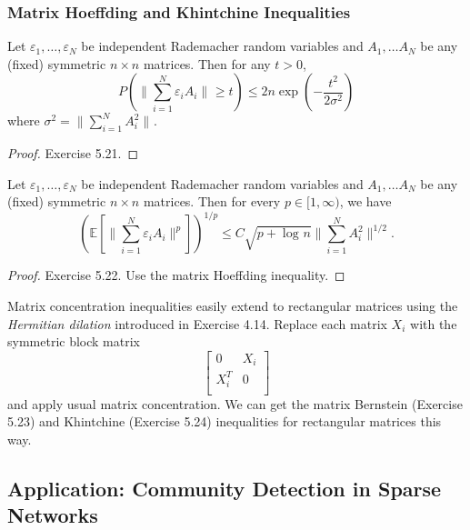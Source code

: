 \subsubsection{Matrix Hoeffding and Khintchine Inequalities}
\begin{theorem}
\label{thm:5.4.13}
Let $\varepsilon_1, \dots, \varepsilon_N$ be independent Rademacher random variables and $A_1, \dots A_N$ be 
any (fixed) symmetric $n \times n$ matrices. Then for any $t > 0$, 
\[ P \left( \lVert \sum_{i = 1}^{N} \varepsilon_i A_i \rVert_{} \geq t \right) 
\leq 2n \exp{\left( -\frac{t^2}{2 \sigma^2} \right)} \]
where $\sigma^2 = \lVert \sum_{i = 1}^{N} A_i^2 \rVert_{}$.
\end{theorem}

\begin{proof}
Exercise 5.21.
\end{proof}

\begin{theorem}
\label{thm:5.4.14}
Let $\varepsilon_1, \dots, \varepsilon_N$ be independent Rademacher random variables and $A_1, \dots A_N$ be 
any (fixed) symmetric $n \times n$ matrices. Then for every $p \in [1, \infty)$, we have 
\[ \left( \mathbb{E}\left[ \lVert \sum_{i = 1}^{N} \varepsilon_i A_i \rVert_{}^p \right] \right)^{1/p} 
\leq C \sqrt{p + \log_{}{n}} \lVert \sum_{i = 1}^{N} A_i^2 \rVert_{}^{1/2}. \]
\end{theorem}

\begin{proof}
Exercise 5.22. Use the matrix Hoeffding inequality.
\end{proof}

\begin{remark}
\label{brmk:5.4.15}
Matrix concentration inequalities easily extend to rectangular matrices using the \textit{Hermitian dilation} 
introduced in Exercise 4.14. Replace each matrix $X_i$ with the symmetric block matrix 
\[ \begin{bmatrix}
0 & X_i \\
X_i^T & 0 \\
\end{bmatrix} \]
and apply usual matrix concentration. We can get the matrix Bernstein (Exercise 5.23) and Khintchine (Exercise 
5.24) inequalities for rectangular matrices this way.
\end{remark}



\subsection{Application: Community Detection in Sparse Networks}



